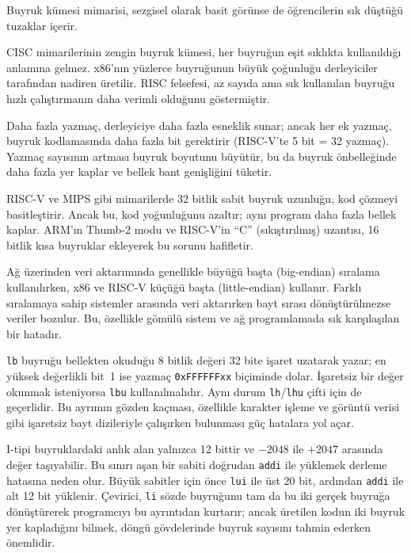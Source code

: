 Buyruk kümesi mimarisi, sezgisel olarak basit görünse de öğrencilerin sık düştüğü tuzaklar içerir.

CISC mimarilerinin zengin buyruk kümesi, her buyruğun eşit sıklıkta kullanıldığı anlamına gelmez. x86'nın yüzlerce buyruğunun büyük çoğunluğu derleyiciler tarafından nadiren üretilir. RISC felsefesi, az sayıda ama sık kullanılan buyruğu hızlı çalıştırmanın daha verimli olduğunu göstermiştir.

Daha fazla yazmaç, derleyiciye daha fazla esneklik sunar; ancak her ek yazmaç, buyruk kodlamasında daha fazla bit gerektirir (RISC-V'te 5 bit = 32 yazmaç). Yazmaç sayısının artması buyruk boyutunu büyütür, bu da buyruk önbelleğinde daha fazla yer kaplar ve bellek bant genişliğini tüketir.

RISC-V ve MIPS gibi mimarilerde 32 bitlik sabit buyruk uzunluğu, kod çözmeyi basitleştirir. Ancak bu, kod yoğunluğunu azaltır; aynı program daha fazla bellek kaplar. ARM'ın Thumb-2 modu ve RISC-V'in ``C'' (sıkıştırılmış) uzantısı, 16 bitlik kısa buyruklar ekleyerek bu sorunu hafifletir.

Ağ üzerinden veri aktarımında genellikle büyüğü başta (big-endian) sıralama kullanılırken, x86 ve RISC-V küçüğü başta (little-endian) kullanır. Farklı sıralamaya sahip sistemler arasında veri aktarırken bayt sırası dönüştürülmezse veriler bozulur. Bu, özellikle gömülü sistem ve ağ programlamada sık karşılaşılan bir hatadır.

\texttt{lb} buyruğu bellekten okuduğu 8 bitlik değeri 32 bite işaret uzatarak yazar; en yüksek değerlikli bit~1 ise yazmaç \texttt{0xFFFFFFxx} biçiminde dolar. İşaretsiz bir değer okunmak isteniyorsa \texttt{lbu} kullanılmalıdır. Aynı durum \texttt{lh}/\texttt{lhu} çifti için de geçerlidir. Bu ayrımın gözden kaçması, özellikle karakter işleme ve görüntü verisi gibi işaretsiz bayt dizileriyle çalışırken bulunması güç hatalara yol açar.

I-tipi buyruklardaki anlık alan yalnızca 12 bittir ve $-2048$ ile $+2047$ arasında değer taşıyabilir. Bu sınırı aşan bir sabiti doğrudan \texttt{addi} ile yüklemek derleme hatasına neden olur. Büyük sabitler için önce \texttt{lui} ile üst 20 bit, ardından \texttt{addi} ile alt 12 bit yüklenir. Çevirici, \texttt{li} sözde buyruğunu tam da bu iki gerçek buyruğa dönüştürerek programcıyı bu ayrıntıdan kurtarır; ancak üretilen kodun iki buyruk yer kapladığını bilmek, döngü gövdelerinde buyruk sayısını tahmin ederken önemlidir.

